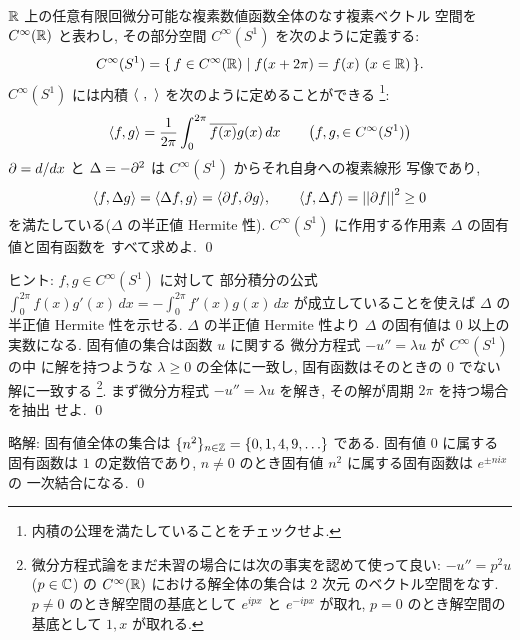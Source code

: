 \documentclass[12pt,twoside]{jarticle}
\newcommand\commentout[1]{#1}
\newcommand\commentout[1]{}
\begin{document}

\begin{question}
  ${\mathbb R}$ 上の任意有限回微分可能な複素数値函数全体のなす複素ベクトル
  空間を $C^\infty({\mathbb R})$ と表わし, 
  その部分空間 $C^\infty(S^1)$ を次のように定義する: 
  \begin{equation*}
    C^\infty(S^1) 
    = \{\, f\in C^\infty({\mathbb R}) \mid f(x+2\pi) = f(x)\ (x\in{\mathbb R}) \,\}.
  \end{equation*}
  $C^\infty(S^1)$ には内積 $\langle\ ,\ \rangle$ を次のように定めることができる%
  \footnote{内積の公理を満たしていることをチェックせよ.}:
  \begin{equation*}
    \langle f,g\rangle = \frac{1}{2\pi}\int_0^{2\pi} \overline{f(x)}g(x)\,dx
    \qquad \bigl(f,g,\in C^\infty(S^1)\bigr)
  \end{equation*}
  $\partial = d/dx$ と $\Delta= -\partial^2$ は $C^\infty(S^1)$ からそれ自身への複素線形
  写像であり, 
  \begin{equation*}
    \langle f,\Delta g\rangle = \langle \Delta f, g\rangle = \langle \partial f, \partial g\rangle,
    \qquad \langle f,\Delta f\rangle = \left|\left|\partial f\right|\right|^2 \ge 0
  \end{equation*}
  を満たしている($\Delta$ の半正値 Hermite 性).  
  $C^\infty(S^1)$ に作用する作用素 $\Delta$ の固有値と固有函数を
  すべて求めよ.  
  \qed
\end{question}

\noindent
ヒント: $f,g\in C^\infty(S^1)$ に対して
部分積分の公式 $\int_0^{2\pi} f(x)g'(x)\,dx = - \int_0^{2\pi} f'(x)g(x)\,dx$ 
が成立していることを使えば $\Delta$ の半正値 Hermite 性を示せる.
$\Delta$ の半正値 Hermite 性より $\Delta$ の固有値は $0$ 以上の実数になる.
固有値の集合は函数 $u$ に関する
微分方程式 $-u''=\lambda u$ が $C^\infty(S^1)$ の中
に解を持つような $\lambda\ge 0$ の全体に一致し, 
固有函数はそのときの $0$ でない解に一致する%
\footnote{微分方程式論をまだ未習の場合には次の事実を認めて使って良い:
  $-u''=p^2 u$ ($p\in{\mathbb C}$) の $C^\infty({\mathbb R})$ における解全体の集合は $2$ 次元
  のベクトル空間をなす.  
  $p\ne 0$ のとき解空間の基底として $e^{ipx}$ と $e^{-ipx}$ が取れ, 
  $p=0$ のとき解空間の基底として $1,x$ が取れる.}.
まず微分方程式 $-u''=\lambda u$ を解き, その解が周期 $2\pi$ を持つ場合を抽出
せよ.
\qed

\commentout{
\medskip
\noindent
略解: 固有値全体の集合は $\{n^2\}_{n\in{\mathbb Z}}=\{0,1,4,9,\ldots\}$ である.
固有値 $0$ に属する固有函数は $1$ の定数倍であり,
$n\ne 0$ のとき固有値 $n^2$ に属する固有函数は $e^{\pm nix}$ の
一次結合になる.  
\qed
}

\end{document}
